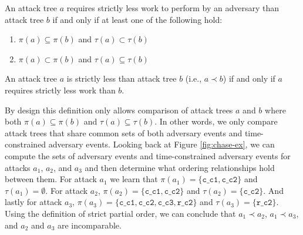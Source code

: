 \documentclass[runningheads]{llncs}
\theoremstyle{definition}
\newcommand{\squash}{\itemsep=0pt\parskip=0pt}
\begin{document}
\begin{definition}
  An attack tree $a$ requires strictly less work to perform by an
  adversary than attack tree $b$ if and only if at least one of the
  following hold:  
\begin{enumerate}
  \squash
  \item $\pi(a) \subseteq \pi(b)$ and $\tau(a) \subset \tau(b)$
  \item $\pi(a) \subset \pi(b)$ and $\tau(a) \subseteq \tau(b)$
\end{enumerate}
\end{definition}

\begin{definition}
  An attack tree $a$ is strictly less than attack tree $b$ (i.e., $a
  \prec b$) if and only if $a$ requires strictly less work than $b$. 
\end{definition}

\noindent By design this definition only allows comparison of
attack trees $a$ and $b$ where both $\pi(a) \subseteq \pi(b)$ and
$\tau(a) \subseteq \tau(b)$. In other words, we only compare attack
trees that share common sets of both adversary events and
time-constrained adversary events. Looking back at Figure
\ref{fig:chase-ex}, we can compute the sets of adversary events and
time-constrained adversary events for attacks $a_1$, $a_2$,
and $a_3$ and then determine what ordering relationships hold between
them. For attack $a_1$ we learn that $\pi(a_1) = \{ \texttt{c\_c1},
\texttt{c\_c2} \}$ and $\tau(a_1) = \emptyset$. For attack $a_2$,
$\pi(a_2) = \{ \texttt{c\_c1}, \texttt{c\_c2} \}$ and $\tau(a_2) = \{
\texttt{c\_c2} \}$. And lastly for attack $a_3$, $\pi(a_3) = \{
\texttt{c\_c1}, \texttt{c\_c2}, \texttt{c\_c3}, \texttt{r\_c2} \}$ and
$\tau(a_3) = \{ \texttt{r\_c2} \}$. Using the definition of strict
partial order, we can conclude that $a_1 \prec a_2$, $a_1 \prec
a_3$, and $a_2$ and $a_3$ are incomparable. 
\end{document}
